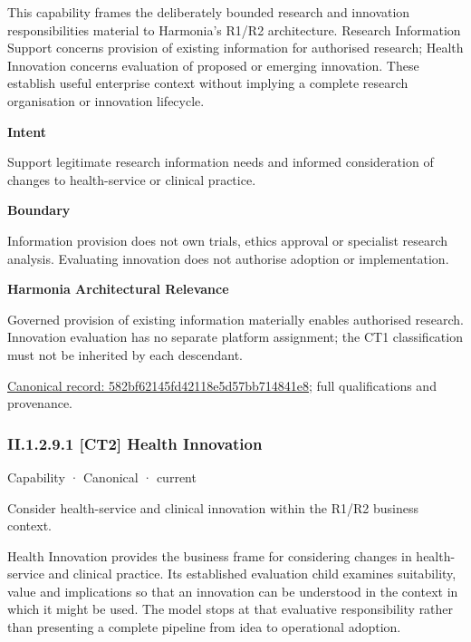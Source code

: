 This capability frames the deliberately bounded research and innovation responsibilities material to Harmonia's R1/R2 architecture. Research Information Support concerns provision of existing information for authorised research; Health Innovation concerns evaluation of proposed or emerging innovation. These establish useful enterprise context without implying a complete research organisation or innovation lifecycle.



\textbf{Intent}



Support legitimate research information needs and informed consideration of changes to health-service or clinical practice.



\textbf{Boundary}



Information provision does not own trials, ethics approval or specialist research analysis. Evaluating innovation does not authorise adoption or implementation.



\textbf{Harmonia Architectural Relevance}



Governed provision of existing information materially enables authorised research. Innovation evaluation has no separate platform assignment; the CT1 classification must not be inherited by each descendant.


{\footnotesize \href{../../../../continuum/strategy/capability/582bf62145fd42118e5d57bb714841e8.md}{Canonical record: 582bf62145fd42118e5d57bb714841e8}; full qualifications and provenance.}\par
\subsubsection*{II.1.2.9.1 [CT2] Health Innovation}
\label{navigation:II.1.2.9.1}

\label{element:f263989e25c9469cac1bbad6491432f0}
{\small Capability · Canonical · current}\par

Consider health-service and clinical innovation within the R1/R2 business context.



Health Innovation provides the business frame for considering changes in health-service and clinical practice. Its established evaluation child examines suitability, value and implications so that an innovation can be understood in the context in which it might be used. The model stops at that evaluative responsibility rather than presenting a complete pipeline from idea to operational adoption.




